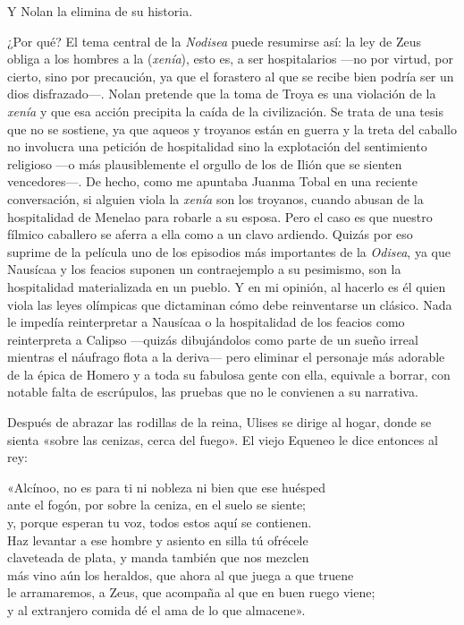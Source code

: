 Y Nolan la elimina de su historia.

¿Por qué? El tema central de la \emph{Nodisea} puede resumirse así: la ley de Zeus obliga a los hombres a la  (\emph{xenía}), esto es, a ser hospitalarios ---no por virtud, por cierto, sino por precaución, ya que el forastero al que se recibe bien podría ser un dios disfrazado---. Nolan pretende que la toma de Troya es una violación de la \emph{xenía} y que esa acción precipita la caída de la civilización. Se trata de una tesis que no se sostiene, ya que aqueos y troyanos están en guerra y la treta del caballo no involucra una petición de hospitalidad sino la explotación del sentimiento religioso ---o más plausiblemente el orgullo de los de Ilión que se sienten vencedores---. De hecho, como me apuntaba Juanma Tobal en una reciente conversación, si alguien viola la \emph{xenía} son los troyanos, cuando abusan de la hospitalidad de Menelao para robarle a su esposa. Pero el caso es que nuestro fílmico caballero se aferra a ella como a un clavo ardiendo. Quizás por eso suprime de la película uno de los episodios más importantes de la \emph{Odisea}, ya que Nausícaa y los feacios suponen un contraejemplo a su pesimismo, son la hospitalidad materializada en un pueblo. Y en mi opinión, al hacerlo es él quien viola las leyes olímpicas que dictaminan cómo debe reinventarse un clásico. Nada le impedía reinterpretar a Nausícaa o la hospitalidad de los feacios como reinterpreta a Calipso ---quizás dibujándolos como parte de un sueño irreal mientras el náufrago flota a la deriva--- pero eliminar el personaje más adorable de la épica de Homero y a toda su fabulosa gente con ella, equivale a borrar, con notable falta de escrúpulos, las pruebas que no le convienen a su narrativa.

Después de abrazar las rodillas de la reina, Ulises se dirige al hogar, donde se sienta «sobre las cenizas, cerca del fuego».
El viejo Equeneo le dice entonces al rey:

\begin{versocita}
«Alcínoo, no es para ti ni nobleza ni bien que ese huésped\\
ante el fogón, por sobre la ceniza, en el suelo se siente;\\
y, porque esperan tu voz, todos estos aquí se contienen.\\
Haz levantar a ese hombre y asiento en silla tú ofrécele\\
claveteada de plata, y manda también que nos mezclen\\
más vino aún los heraldos, que ahora al que juega a que truene\\
le arramaremos, a Zeus, que acompaña al que en buen ruego viene;\\
y al extranjero comida dé el ama de lo que almacene».
\end{versocita}

